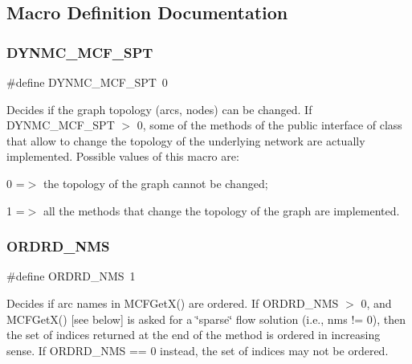 \subsection{Macro Definition Documentation}
\mbox{\label{group___s_p_t_r_e_e___m_a_c_r_o_s_gad5743edcdb08edda28cc06bd329d6f03}} 
\subsubsection{\texorpdfstring{D\+Y\+N\+M\+C\+\_\+\+M\+C\+F\+\_\+\+S\+PT}{DYNMC\_MCF\_SPT}}
{\footnotesize\ttfamily \#define D\+Y\+N\+M\+C\+\_\+\+M\+C\+F\+\_\+\+S\+PT~0}

Decides if the graph topology (arcs, nodes) can be changed. If D\+Y\+N\+M\+C\+\_\+\+M\+C\+F\+\_\+\+S\+PT $>$ 0, some of the methods of the public interface of class that allow to change the topology of the underlying network are actually implemented. Possible values of this macro are\+:


\begin{DoxyItemize}
\item 0 =$>$ the topology of the graph cannot be changed;
\item 1 =$>$ all the methods that change the topology of the graph are implemented. 
\end{DoxyItemize}\mbox{\label{group___s_p_t_r_e_e___m_a_c_r_o_s_ga51ea746230b8df61d22a28b55c30527e}} 
\subsubsection{\texorpdfstring{O\+R\+D\+R\+D\+\_\+\+N\+MS}{ORDRD\_NMS}}
{\footnotesize\ttfamily \#define O\+R\+D\+R\+D\+\_\+\+N\+MS~1}

Decides if arc names in M\+C\+F\+Get\+X() are ordered. If O\+R\+D\+R\+D\+\_\+\+N\+MS $>$ 0, and M\+C\+F\+Get\+X() \mbox{[}see below\mbox{]} is asked for a \char`\"{}sparse\char`\"{} flow solution (i.\+e., nms != 0), then the set of indices returned at the end of the method is ordered in increasing sense. If O\+R\+D\+R\+D\+\_\+\+N\+MS == 0 instead, the set of indices may not be ordered.


